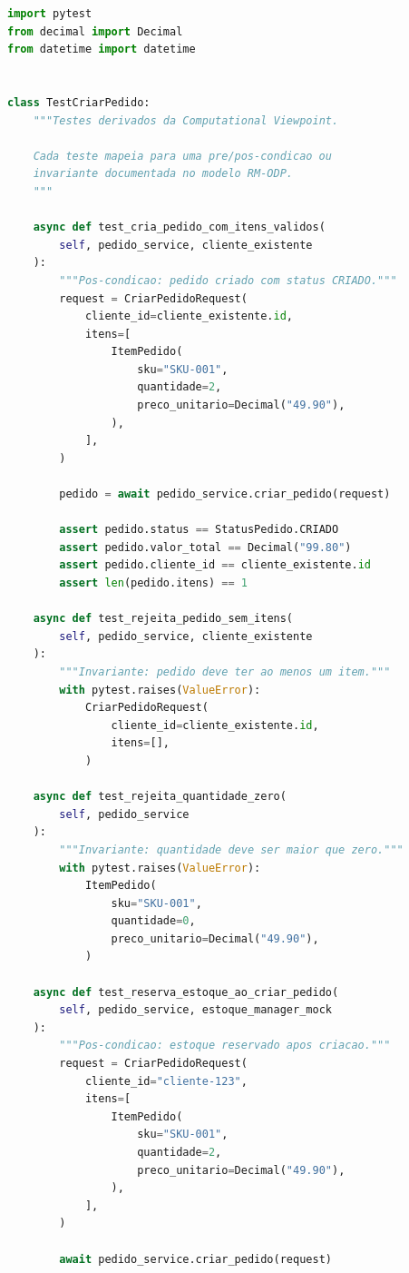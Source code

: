 \begin{lstlisting}[language=Python, caption={Testes derivados das vistas do RM-ODP}]
import pytest
from decimal import Decimal
from datetime import datetime


class TestCriarPedido:
    """Testes derivados da Computational Viewpoint.

    Cada teste mapeia para uma pre/pos-condicao ou
    invariante documentada no modelo RM-ODP.
    """

    async def test_cria_pedido_com_itens_validos(
        self, pedido_service, cliente_existente
    ):
        """Pos-condicao: pedido criado com status CRIADO."""
        request = CriarPedidoRequest(
            cliente_id=cliente_existente.id,
            itens=[
                ItemPedido(
                    sku="SKU-001",
                    quantidade=2,
                    preco_unitario=Decimal("49.90"),
                ),
            ],
        )

        pedido = await pedido_service.criar_pedido(request)

        assert pedido.status == StatusPedido.CRIADO
        assert pedido.valor_total == Decimal("99.80")
        assert pedido.cliente_id == cliente_existente.id
        assert len(pedido.itens) == 1

    async def test_rejeita_pedido_sem_itens(
        self, pedido_service, cliente_existente
    ):
        """Invariante: pedido deve ter ao menos um item."""
        with pytest.raises(ValueError):
            CriarPedidoRequest(
                cliente_id=cliente_existente.id,
                itens=[],
            )

    async def test_rejeita_quantidade_zero(
        self, pedido_service
    ):
        """Invariante: quantidade deve ser maior que zero."""
        with pytest.raises(ValueError):
            ItemPedido(
                sku="SKU-001",
                quantidade=0,
                preco_unitario=Decimal("49.90"),
            )

    async def test_reserva_estoque_ao_criar_pedido(
        self, pedido_service, estoque_manager_mock
    ):
        """Pos-condicao: estoque reservado apos criacao."""
        request = CriarPedidoRequest(
            cliente_id="cliente-123",
            itens=[
                ItemPedido(
                    sku="SKU-001",
                    quantidade=2,
                    preco_unitario=Decimal("49.90"),
                ),
            ],
        )

        await pedido_service.criar_pedido(request)


\end{lstlisting}
